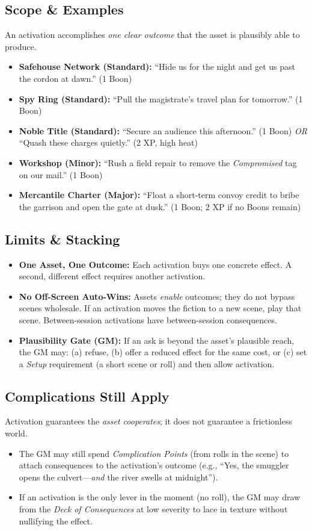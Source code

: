 \documentclass[12pt]{article}
\begin{document}
\subsection*{Scope \& Examples}
An activation accomplishes \emph{one clear outcome} that the asset is plausibly able to produce.
\begin{itemize}
  \item \textbf{Safehouse Network (Standard):} ``Hide us for the night and get us past the cordon at dawn.'' (1 Boon)
  \item \textbf{Spy Ring (Standard):} ``Pull the magistrate’s travel plan for tomorrow.'' (1 Boon)
  \item \textbf{Noble Title (Standard):} ``Secure an audience this afternoon.'' (1 Boon) \emph{OR} ``Quash these charges quietly.'' (2 XP, high heat)
  \item \textbf{Workshop (Minor):} ``Rush a field repair to remove the \emph{Compromised} tag on our mail.'' (1 Boon)
  \item \textbf{Mercantile Charter (Major):} ``Float a short-term convoy credit to bribe the garrison and open the gate at dusk.'' (1 Boon; 2 XP if no Boons remain)
\end{itemize}

\subsection*{Limits \& Stacking}
\begin{itemize}
  \item \textbf{One Asset, One Outcome:} Each activation buys one concrete effect. A second, different effect requires another activation.
  \item \textbf{No Off-Screen Auto-Wins:} Assets \emph{enable} outcomes; they do not bypass scenes wholesale. If an activation moves the fiction to a new scene, play that scene. Between-session activations have between-session consequences. 
  \item \textbf{Plausibility Gate (GM):} If an ask is beyond the asset’s plausible reach, the GM may: (a) refuse, (b) offer a reduced effect for the same cost, or (c) set a \emph{Setup} requirement (a short scene or roll) and then allow activation.
\end{itemize}

\subsection*{Complications Still Apply}
Activation guarantees the \emph{asset cooperates}; it does not guarantee a frictionless world.
\begin{itemize}
  \item The GM may still spend \emph{Complication Points} (from rolls in the scene) to attach consequences to the activation’s outcome (e.g., ``Yes, the smuggler opens the culvert—\emph{and} the river swells at midnight'').
  \item If an activation is the only lever in the moment (no roll), the GM may draw from the \emph{Deck of Consequences} at low severity to lace in texture without nullifying the effect.
\end{itemize}
\end{document}
